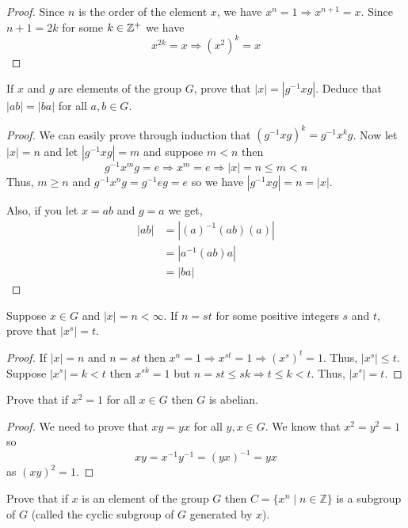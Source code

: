 \begin{proof}
    Since $n$ is the order of the element $x$, we have $x^n=1 \Rightarrow x^{n+1}=x$. Since $n+1 = 2k$ for some $k \in \mathbb{Z}^+$ we have
    \[ x^{2k} = x \Rightarrow (x^2)^k=x \]  
\end{proof}

\begin{problem}
    If $x$ and $g$ are elements of the group $G$, prove that $|x| = |g^{-1}xg|$. Deduce that $|ab| = |ba|$ for all $a, b \in G$.
\end{problem}

\begin{proof}
    We can easily prove through induction that $(g^{-1}xg)^k=g^{-1}x^kg$. Now let $|x|=n$ and let $|g^{-1}xg|=m$ and suppose
    $m < n$ then 
    \[ g^{-1}x^mg = e \Rightarrow x^m=e \Rightarrow |x| = n \le m < n \]
    Thus, $m \ge n$ and $g^{-1}x^ng=g^{-1} e g = e$ so we have $|g^{-1}xg|=n=|x|$.

    Also, if you let $x=ab$ and $g=a$ we get,
    \begin{align*}
        |ab| &= |(a)^{-1} (ab) (a)| \\
         &= |a^{-1}(ab)a| \\
         &= |ba|
    \end{align*}
\end{proof}

\begin{problem}
    Suppose $x \in G$ and $|x| = n < \infty$. If $n = st$ for some positive integers $s$ and $t$, prove that $|x^s| = t$.
\end{problem}

\begin{proof}
    If $|x|=n$ and $n=st$ then $x^n=1 \Rightarrow x^{st}=1 \Rightarrow (x^s)^t=1$. Thus, $|x^s| \le t$.
    Suppose $|x^s|=k<t$ then $x^{sk}=1$ but $n=st \le sk \Rightarrow t \le k < t$. Thus, $|x^s|=t$.
\end{proof}

\begin{problem}
    Prove that if $x^2 = 1$ for all $x \in G$ then $G$ is abelian.
\end{problem}

\begin{proof}
    We need to prove that $xy=yx$ for all $y,x \in G$. We know that $x^2=y^2=1$ so 
    \[ xy=x^{-1}y^{-1}=(yx)^{-1}=yx \]
    as $(xy)^2=1$.
\end{proof}

\begin{problem}
    Prove that if $x$ is an element of the group $G$ then $C=\{x^n \mid n \in \mathbb{Z}\}$ is 
    a subgroup of $G$ (called the cyclic subgroup of $G$ generated by $x$).
\end{problem}

